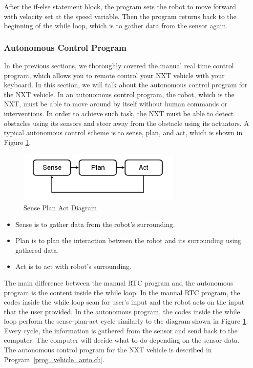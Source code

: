\documentclass[11pt]{article}
\begin{document}
After the if-else statement block, the program sets the robot to move forward with velocity set at the speed variable.
Then the program returns back to the beginning of the while loop, which is to gather data from the sensor again.

\subsubsection{Autonomous Control Program}
In the previous sections, we thoroughly covered the manual real time control program, which allows you to 
remote control your NXT vehicle with your keyboard.
In this section, we will talk about the autonomous control program for the NXT vehicle.
In an autonomous control program, the robot, which is the NXT, must be able to move around by itself without
human commands or interventions. In order to achieve such task, the NXT must be able to detect obstacles using 
its sensors and steer away from the obstacle using its actuators.
A typical autonomous control scheme is to sense, plan, and act, which is shown in Figure \ref{fig_NXT_SPA}.
\begin{figure}[h]
  \begin{center}
    \includegraphics[height=1in]{figure/mindstorm/Senseplanact.png}
    \caption{Sense Plan Act Diagram \label{fig_NXT_SPA}}
  \end{center}
\end{figure}

\begin{itemize}
\item Sense is to gather data from the robot's surrounding.
\item Plan is to plan the interaction between the robot and its surrounding using gathered data.
\item Act is to act with robot's surrounding.
\end{itemize}

The main difference between the manual RTC program and the autonomous program is the content inside the while loop.
In the manual RTC program, the codes inside the while loop scan for user's input and the robot acts on the input that
the user provided. In the autonomous program, the codes inside the while loop perform the sense-plan-act cycle similarly 
to the diagram shown in Figure \ref{fig_NXT_SPA}. Every cycle, the information is gathered from the sensor and send 
back to the computer. The computer will decide what to do depending on the sensor data. The autonomous control program 
for the NXT vehicle is described in Program~\ref{prog_vehicle_auto.ch}.
\end{document}
